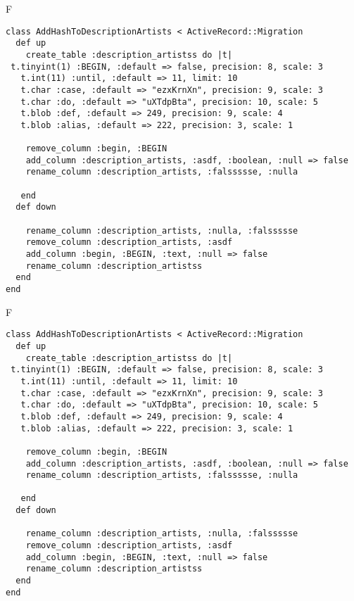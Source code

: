 F
\begin{verbatim}
class AddHashToDescriptionArtists < ActiveRecord::Migration
  def up
    create_table :description_artistss do |t| 
 t.tinyint(1) :BEGIN, :default => false, precision: 8, scale: 3
   t.int(11) :until, :default => 11, limit: 10
   t.char :case, :default => "ezxKrnXn", precision: 9, scale: 3
   t.char :do, :default => "uXTdpBta", precision: 10, scale: 5
   t.blob :def, :default => 249, precision: 9, scale: 4
   t.blob :alias, :default => 222, precision: 3, scale: 1

    remove_column :begin, :BEGIN
    add_column :description_artists, :asdf, :boolean, :null => false
    rename_column :description_artists, :falssssse, :nulla

   end
  def down

    rename_column :description_artists, :nulla, :falssssse
    remove_column :description_artists, :asdf
    add_column :begin, :BEGIN, :text, :null => false
    rename_column :description_artistss
  end
end
\end{verbatim}

F
\begin{verbatim}
class AddHashToDescriptionArtists < ActiveRecord::Migration
  def up
    create_table :description_artistss do |t| 
 t.tinyint(1) :BEGIN, :default => false, precision: 8, scale: 3
   t.int(11) :until, :default => 11, limit: 10
   t.char :case, :default => "ezxKrnXn", precision: 9, scale: 3
   t.char :do, :default => "uXTdpBta", precision: 10, scale: 5
   t.blob :def, :default => 249, precision: 9, scale: 4
   t.blob :alias, :default => 222, precision: 3, scale: 1

    remove_column :begin, :BEGIN
    add_column :description_artists, :asdf, :boolean, :null => false
    rename_column :description_artists, :falssssse, :nulla

   end
  def down

    rename_column :description_artists, :nulla, :falssssse
    remove_column :description_artists, :asdf
    add_column :begin, :BEGIN, :text, :null => false
    rename_column :description_artistss
  end
end
\end{verbatim}

